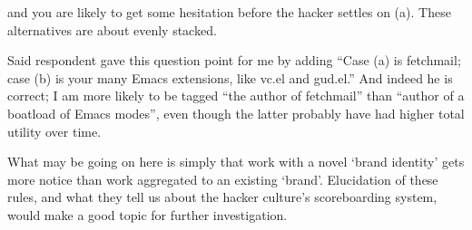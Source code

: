 and you are likely to get some hesitation before the hacker settles on (a).
These alternatives are about evenly stacked.

Said respondent gave this question point for me by adding ``Case (a) is
fetchmail; case (b) is your many Emacs extensions, like vc.el and gud.el.'' And
indeed he is correct; I am more likely to be tagged ``the author of fetchmail''
than ``author of a boatload of Emacs modes'', even though the latter probably
have had higher total utility over time.

What may be going on here is simply that work with a novel `brand identity' gets
more notice than work aggregated to an existing `brand'.  Elucidation of these
rules, and what they tell us about the hacker culture's scoreboarding system,
would make a good topic for further investigation.
